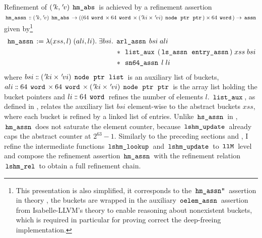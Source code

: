 Refinement of $({\mskip2mu '\mskip-2muk},{\mskip2mu '\mskip-2muv}) \; \,\text{\ttfamily hm\_abs}\,$ is achieved by a refinement assertion
$\,\text{\ttfamily hm\_assn}\, \mathrel{\mathord{:}\mkern-1.2mu\mathord{:}} ({\mskip2mu '\mskip-2muk},{\mskip2mu '\mskip-2muv}) \; \,\text{\ttfamily hm\_abs}\, \rightarrow ((64 \; \,\text{\ttfamily word}\, \times 64 \; \,\text{\ttfamily word}\, \times ({\mskip2mu '\mskip-2muki} \times {\mskip2mu '\mskip-2muvi}) \; \,\text{\ttfamily node}\, \; \,\text{\ttfamily ptr}\, \; \,\text{\ttfamily ptr}\,) \times 64 \; \,\text{\ttfamily word}\,) \rightarrow \,\text{\ttfamily assn}\,$
given by\footnote{
	This presentation is also simplified, it corresponds to the $\,\text{\ttfamily hm\_assn''}\,$ assertion in theory , the buckets are wrapped in the auxiliary $\,\text{\ttfamily oelem\_assn}\,$ assertion from Isabelle-LLVM's  theory to enable reasoning about nonexistent buckets, which is required in particular for proving correct the deep-freeing implementation.
}
\begin{align*}
	\,\text{\ttfamily hm\_assn}\, := \lambda (xss,l) \; (ali,li). \; \exists bsi. \;
	 & \,\text{\ttfamily arl\_assn}\, \; bsi \; ali                                                          \\
	 & \ast \; \,\text{\ttfamily list\_aux}\, \; (\,\text{\ttfamily ls\_assn}\, \; \,\text{\ttfamily entry\_assn}\,) \; xss \; bsi \\
	 & \ast \; \,\text{\ttfamily sn64\_assn}\, \; l \; li
\end{align*}
where $bsi \mathrel{\mathord{:}\mkern-1.2mu\mathord{:}} ({\mskip2mu '\mskip-2muki} \times {\mskip2mu '\mskip-2muvi}) \; \,\text{\ttfamily node}\, \; \,\text{\ttfamily ptr}\, \; \,\text{\ttfamily list}\,$ is an auxiliary list of buckets, $ali \mathrel{\mathord{:}\mkern-1.2mu\mathord{:}} 64 \; \,\text{\ttfamily word}\, \times 64 \; \,\text{\ttfamily word}\, \times ({\mskip2mu '\mskip-2muki} \times {\mskip2mu '\mskip-2muvi}) \; \,\text{\ttfamily node}\, \; \,\text{\ttfamily ptr}\, \; \,\text{\ttfamily ptr}\,$ is the array list holding the bucket pointers and $li \mathrel{\mathord{:}\mkern-1.2mu\mathord{:}} 64 \; \,\text{\ttfamily word}\,$ refines the number of elements $l$.
$\,\text{\ttfamily list\_aux}\,$, as defined in , relates the auxiliary list $bsi$ element-wise to the abstract buckets $xss$, where each bucket is refined by a linked list of entries.
Unlike $\,\text{\ttfamily hs\_assn}\,$ in , $\,\text{\ttfamily hm\_assn}\,$ does not saturate the element counter, because $\,\text{\ttfamily lshm\_update}\,$ already caps the abstract counter at $2^{63}-1$.
Similarly to the preceding sections  and , I refine the intermediate functions $\,\text{\ttfamily lshm\_lookup}\,$ and $\,\text{\ttfamily lshm\_update}\,$ to $\,\text{\ttfamily llM}\,$ level and compose the refinement assertion $\,\text{\ttfamily hm\_assn}\,$ with the refinement relation $\,\text{\ttfamily lshm\_rel}\,$ to obtain a full refinement chain.

